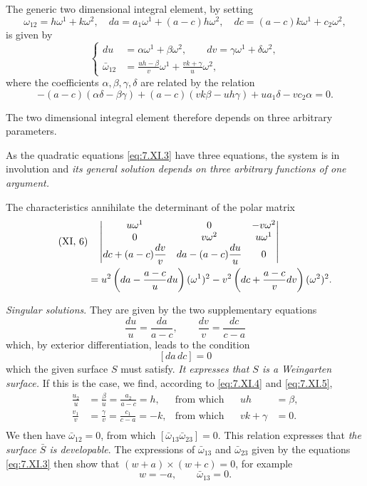 \documentclass[leqno,11pt]{book}
\numberwithin{equation}{chapter}
\theoremstyle{shape1}
\theoremstyle{shape0}
\theoremstyle{shape2}
\theoremstyle{definition}
\begin{document}
The generic two dimensional integral element, by setting
\begin{equation}
  \label{eq:7.XI.4}\tag{XI, 4}
  \omega_{12}=h\omega^{1}+k\omega^{2},\quad da=a_{1}\omega^{1}+(a-c)h\omega^{2},\quad dc=(a-c)k\omega^{1}+c_{2}\omega^{2},
\end{equation}
is given by
\begin{equation}
  \label{eq:7.XI.5}\tag{XI, 5}
  \left\{
    \begin{aligned}
      du&=\alpha\omega^{1}+\beta\omega^{2},\qquad dv=\gamma\omega^{1}+\delta\omega^{2},\\
      \bar\omega_{12}&=\frac{uh-\beta}{v}\omega^{1}+\frac{vk+\gamma}{u}\omega^{2},
    \end{aligned}
  \right.
\end{equation}
where the coefficients $\alpha,\beta,\gamma,\delta$ are related by the relation
\[
-(a-c)(\alpha\delta-\beta\gamma)+(a-c)(vk\beta-uh\gamma)+ua_{1}\delta-vc_{2}\alpha=0.
\]

The two dimensional integral element therefore depends on three arbitrary parameters.

As the quadratic equations \eqref{eq:7.XI.3} have three equations, the system is in involution and \emph{its general solution depends on three arbitrary functions of one argument.}

The characteristics annihilate the determinant of the polar matrix
\begin{align}
  \label{eq:7.XI.6}\tag{XI, 6}
  &\quad
  \begin{vmatrix}
    u\omega^{1}&0&-v\omega^{2}\\
    0&v\omega^{2}&u\omega^{1}\\
    dc+(a-c)\dfrac{dv}{v}&da-(a-c)\dfrac{du}{u}&0
  \end{vmatrix}\\
  &=u^{2}\left(da-\frac{a-c}{u}du\right)(\omega^{1})^{2}-v^{2}\left(dc+\frac{a-c}{v}dv\right)(\omega^{2})^{2}.\notag
\end{align}

\vspace{12pt}\fsec\emph{Singular solutions}. They are given by the two supplementary equations
\[
\frac{du}{u}=\frac{da}{a-c},\qquad\frac{dv}{v}=\frac{dc}{c-a}
\]
which, by exterior differentiation, leads to the condition
\[
[da\,dc]=0
\]
which the given surface $S$ must satisfy. \emph{It expresses that $S$ is a Weingarten surface.} If this is the case, we find, according to \eqref{eq:7.XI.4} and \eqref{eq:7.XI.5},
\begin{align*}
  \frac{u_{2}}{u}&=\frac{\beta}{u}=\frac{a_{2}}{a-c}=h,&\text{from which}&&uh&=\beta,\\
  \frac{v_{1}}{v}&=\frac{\gamma}{v}=\frac{c_{1}}{c-a}=-k,&\text{from which}&&vk+\gamma&=0.\\
\end{align*}
We then have $\bar\omega_{12}=0$, from which $[\bar\omega_{13}\bar\omega_{23}]=0$. This relation expresses that \emph{the surface $\bar S$ is developable}. The expressions of $\bar\omega_{13}$ and $\bar\omega_{23}$ given by the equations \eqref{eq:7.XI.3} then show that $(w+a)\times(w+c)=0$, for example
\[
w=-a,\qquad\bar\omega_{13}=0.
\]
\end{document}
